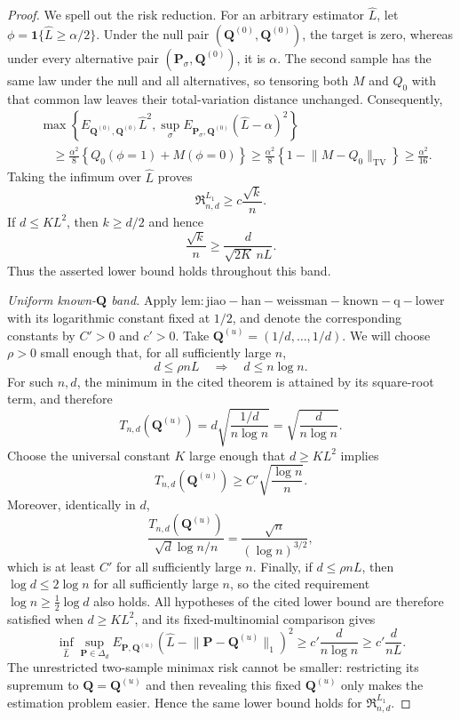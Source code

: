 \documentclass{article}
\begin{document}
\begin{proof}
We spell out the risk reduction.  For an arbitrary estimator \(\widehat L\), let \(\phi=\mathbf 1\{\widehat L\ge\alpha/2\}\).  Under the null pair \((\mathbf Q^{(0)},\mathbf Q^{(0)})\), the target is zero, whereas under every alternative pair \((\mathbf P_\sigma,\mathbf Q^{(0)})\), it is \(\alpha\).  The second sample has the same law under the null and all alternatives, so tensoring both \(M\) and \(Q_0\) with that common law leaves their total-variation distance unchanged.  Consequently,
\[
 \begin{aligned}
 &\max\left\{
 E_{\mathbf Q^{(0)},\mathbf Q^{(0)}}\widehat L^2,
 \sup_\sigma E_{\mathbf P_\sigma,\mathbf Q^{(0)}}(\widehat L-\alpha)^2
 \right\}\\
 &\quad\ge
 \frac{\alpha^2}{8}
 \left\{Q_0(\phi=1)+M(\phi=0)\right\}
 \ge \frac{\alpha^2}{8}
 \left\{1-\lVert M-Q_0\rVert_{\mathrm{TV}}\right\}
 \ge\frac{\alpha^2}{16}.
 \end{aligned}
\]
Taking the infimum over \(\widehat L\) proves
\[
 \mathfrak R^{L_1}_{n,d}\ge c\frac{\sqrt{k}}{n}.
\]
If \(d\le K L^2\), then \(k\ge d/2\) and hence
\[
 \frac{\sqrt{k}}n
 \ge \frac{d}{\sqrt{2K}\,nL}.
\]
Thus the asserted lower bound holds throughout this band.

\emph{Uniform known-\(\mathbf Q\) band.}
Apply \(\mathrm{lem:jiao-han-weissman-known-q-lower}\) with its logarithmic constant fixed at \(1/2\), and denote the corresponding constants by \(C'>0\) and \(c'>0\).  Take \(\mathbf Q^{(u)}=(1/d,\ldots,1/d)\).  We will choose \(\rho>0\) small enough that, for all sufficiently large \(n\),
\[
 d\le\rho nL\quad\Longrightarrow\quad d\le n\log n.
\]
For such \(n,d\), the minimum in the cited theorem is attained by its square-root term, and therefore
\[
 T_{n,d}(\mathbf Q^{(u)})
 =d\sqrt{\frac{1/d}{n\log n}}
 =\sqrt{\frac d{n\log n}}.
\]
Choose the universal constant \(K\) large enough that \(d\ge K L^2\) implies
\[
 T_{n,d}(\mathbf Q^{(u)})
 \ge C'\sqrt{\frac{\log n}{n}}.
\]
Moreover, identically in \(d\),
\[
 \frac{T_{n,d}(\mathbf Q^{(u)})}{\sqrt d\log n/n}
 =\frac{\sqrt n}{(\log n)^{3/2}},
\]
which is at least \(C'\) for all sufficiently large \(n\).  Finally, if \(d\le\rho nL\), then \(\log d\le2\log n\) for all sufficiently large \(n\), so the cited requirement \(\log n\ge\frac12\log d\) also holds.  All hypotheses of the cited lower bound are therefore satisfied when \(d\ge K L^2\), and its fixed-multinomial comparison gives
\[
 \inf_{\widehat L}
 \sup_{\mathbf P\in\Delta_d}
 E_{\mathbf P,\mathbf Q^{(u)}}
 \left(\widehat L-\lVert\mathbf P-\mathbf Q^{(u)}\rVert_1\right)^2
 \ge c'\frac d{n\log n}
 \ge c'\frac d{nL}.
\]
The unrestricted two-sample minimax risk cannot be smaller: restricting its supremum to \(\mathbf Q=\mathbf Q^{(u)}\) and then revealing this fixed \(\mathbf Q^{(u)}\) only makes the estimation problem easier.  Hence the same lower bound holds for \(\mathfrak R^{L_1}_{n,d}\).


\end{proof}
\end{document}
